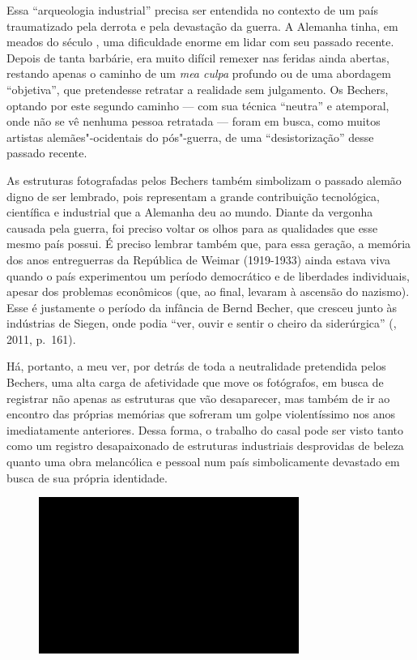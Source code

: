 Essa ``arqueologia industrial'' precisa ser entendida no contexto de um
país traumatizado pela derrota e pela devastação da guerra. A Alemanha
tinha, em meados do século , uma dificuldade enorme em lidar com seu
passado recente. Depois de tanta barbárie, era muito difícil remexer nas
feridas ainda abertas, restando apenas o caminho de um \emph{mea culpa}
profundo ou de uma abordagem ``objetiva'', que pretendesse retratar a
realidade sem julgamento. Os Bechers, optando por este segundo caminho
--- com sua técnica ``neutra'' e atemporal, onde não se vê nenhuma pessoa
retratada --- foram em busca, como muitos artistas alemães"-ocidentais do
pós"-guerra, de uma ``desistorização'' desse passado recente.

As estruturas fotografadas pelos Bechers também simbolizam o passado
alemão digno de ser lembrado, pois representam a grande contribuição
tecnológica, científica e industrial que a Alemanha deu ao mundo. Diante
da vergonha causada pela guerra, foi preciso voltar os olhos para as
qualidades que esse mesmo país possui. É preciso lembrar também que,
para essa geração, a memória dos anos entreguerras da República de
Weimar (1919-1933) ainda estava viva quando o país experimentou um
período democrático e de liberdades individuais, apesar dos problemas
econômicos (que, ao final, levaram à ascensão do nazismo). Esse é
justamente o período da infância de Bernd Becher, que cresceu junto às
indústrias de Siegen, onde podia ``ver, ouvir e sentir o cheiro da
siderúrgica'' (, 2011, p.~161).

Há, portanto, a meu ver, por detrás de toda a neutralidade pretendida
pelos Bechers, uma alta carga de afetividade que move os fotógrafos, em
busca de registrar não apenas as estruturas que vão desaparecer, mas
também de ir ao encontro das próprias memórias que sofreram um golpe
violentíssimo nos anos imediatamente anteriores. Dessa forma, o trabalho
do casal pode ser visto tanto como um registro desapaixonado de
estruturas industriais desprovidas de beleza quanto uma obra melancólica
e pessoal num país simbolicamente devastado em busca de sua própria
identidade.

\begin{figure}[!ht]

\centering
 \includegraphics[width=85mm]{./imgs/im1.jpg}
\caption{\tiny{}}

\end{figure}

